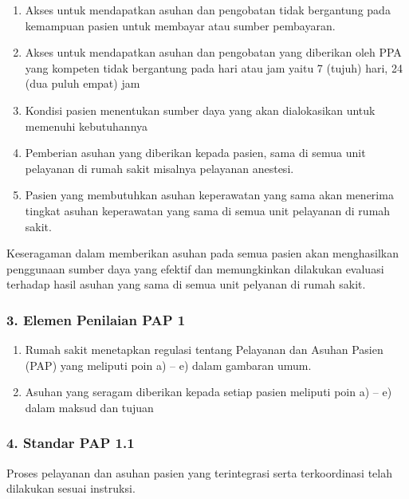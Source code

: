 \documentclass[
]{book}
\providecommand{\tightlist}{%
  \setlength{\itemsep}{0pt}\setlength{\parskip}{0pt}}
\begin{document}
\begin{enumerate}
\def\labelenumi{\alph{enumi}.}
\tightlist
\item
  Akses untuk mendapatkan asuhan dan pengobatan tidak bergantung pada kemampuan pasien untuk membayar atau sumber pembayaran.
\item
  Akses untuk mendapatkan asuhan dan pengobatan yang diberikan oleh PPA yang kompeten tidak bergantung pada hari atau jam yaitu 7 (tujuh) hari, 24 (dua puluh empat) jam
\item
  Kondisi pasien menentukan sumber daya yang akan dialokasikan untuk memenuhi kebutuhannya
\item
  Pemberian asuhan yang diberikan kepada pasien, sama di semua unit pelayanan di rumah sakit misalnya pelayanan anestesi.
\item
  Pasien yang membutuhkan asuhan keperawatan yang sama akan menerima tingkat asuhan keperawatan yang sama di semua unit pelayanan di rumah sakit.
\end{enumerate}

Keseragaman dalam memberikan asuhan pada semua pasien akan menghasilkan penggunaan sumber daya yang efektif dan memungkinkan dilakukan evaluasi terhadap hasil asuhan yang sama di semua unit pelyanan di rumah sakit.

\hypertarget{elemen-penilaian-pap-1}{%
\subsubsection*{3. Elemen Penilaian PAP 1}\label{elemen-penilaian-pap-1}}

\begin{enumerate}
\def\labelenumi{\alph{enumi}.}
\tightlist
\item
  Rumah sakit menetapkan regulasi tentang Pelayanan dan Asuhan Pasien (PAP) yang meliputi poin a) -- e) dalam gambaran umum.
\item
  Asuhan yang seragam diberikan kepada setiap pasien meliputi poin a) -- e) dalam maksud dan tujuan
\end{enumerate}

\hypertarget{standar-pap-1.1}{%
\subsubsection*{4. Standar PAP 1.1}\label{standar-pap-1.1}}

Proses pelayanan dan asuhan pasien yang terintegrasi serta terkoordinasi telah dilakukan sesuai instruksi.
\end{document}
